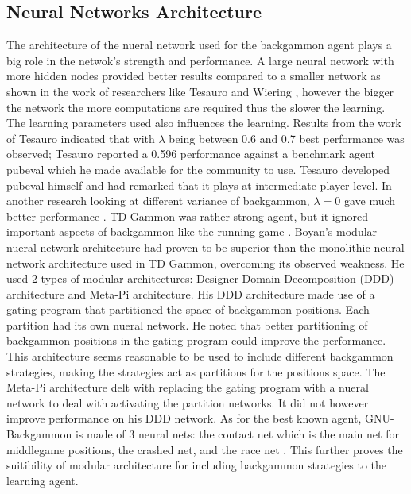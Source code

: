 \documentclass[12pt,a4paper]{article}
\begin{document}
\subsection{Neural Networks Architecture}
The architecture of the nueral network used for the backgammon agent plays a big role in the netwok's strength and performance. A large neural network with more hidden nodes provided better results compared to a smaller network as shown in the work of researchers like Tesauro \citeyear{DBLP:journals/ai/Tesauro02} and Wiering \citeyear{DBLP:journals/jilsa/Wiering10}, however the bigger the network the more computations are required thus the slower the learning. The learning parameters used also influences the learning. Results from the work of Tesauro \citeyear{DBLP:journals/ai/Tesauro02} indicated that with $\lambda$ being between 0.6 and 0.7 best performance was observed; Tesauro \citeyear{pubeval} reported a 0.596 performance against a benchmark agent pubeval which he made available for the community to use. Tesauro developed pubeval himself and had remarked that it plays at intermediate player level. In another research looking at different variance of backgammon, $\lambda=0$ gave much better performance \cite{DBLP:conf/ifip12/PapahristouR12}. TD-Gammon was rather strong agent, but it ignored important aspects of backgammon like the running game \cite{survey}. Boyan's \citeyear{boyan} modular nueral network architecture had proven to be superior than the monolithic neural network architecture used in TD Gammon, overcoming its observed weakness. He used 2 types of modular architectures: Designer Domain Decomposition (DDD) architecture and Meta-Pi architecture. His DDD architecture made use of a gating program that partitioned the space of backgammon positions. Each partition had its own nueral network. He noted that better partitioning of backgammon positions in the gating program could improve the performance. This architecture seems reasonable to be used to include different backgammon strategies, making the strategies act as partitions for the positions space. The Meta-Pi architecture delt with replacing the gating program with a nueral network to deal with activating the partition networks. It did not however improve performance on his DDD network. As for the best known agent, GNU-Backgammon is made of 3 neural nets: the contact net which is the main net for middlegame positions, the crashed net, and the race net \cite{gnubg}. This further proves the suitibility of modular architecture for including backgammon strategies to the learning agent.
\end{document}
